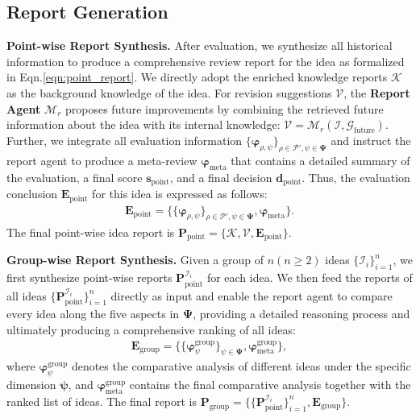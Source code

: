 \subsection{Report Generation}
\label{sec:report}
\textbf{Point-wise Report Synthesis.}
After evaluation, we synthesize all historical information to produce a comprehensive review report for the idea as formalized in Eqn.\ref{eqn:point_report}.
We directly adopt the enriched knowledge reports $\boldsymbol{\mathcal{K}}$ as the background knowledge of the idea.
For revision suggestions $\boldsymbol{\mathcal{V}}$, the \textbf{Report Agent} $\boldsymbol{\mathcal{M}}_r$ proposes future improvements by combining the retrieved future information about the idea with its internal knowledge: $\boldsymbol{\mathcal{V}}=\boldsymbol{\mathcal{M}}_r(\boldsymbol{\mathcal{I}},\boldsymbol{\mathcal{G}}_\textrm{future})$.
Further, we integrate all evaluation information $\{\boldsymbol{\varphi}_{\rho,\psi}\}_{\rho\in\boldsymbol{\mathcal{P}}',\psi\in\boldsymbol{\Psi}}$ and instruct the report agent to produce a meta-review $\boldsymbol{\varphi}_\textrm{meta}$ that contains a detailed summary of the evaluation, a final score $\boldsymbol{s}_\textrm{point}$, and a final decision $\boldsymbol{d}_\textrm{point}$.
Thus, the evaluation conclusion $\boldsymbol{E}_\textrm{point}$ for this idea is expressed as follows:
\begin{align}
    \boldsymbol{E}_\textrm{point}=\{\{\boldsymbol{\varphi}_{\rho,\psi}\}_{\rho\in\boldsymbol{\mathcal{P}}',\psi\in\boldsymbol{\Psi}},\boldsymbol{\varphi}_\textrm{meta}\}.
\end{align}
The final point-wise idea report is $\boldsymbol{P}_{\textrm{point}}=\{\boldsymbol{\mathcal{K}},\boldsymbol{\mathcal{V}},\boldsymbol{E}_{\textrm{point}}\}$.

\textbf{Group-wise Report Synthesis.}
Given a group of $n(n\ge2)$ ideas $\{\boldsymbol{\mathcal{I}}_i\}_{i=1}^n$, we first synthesize point-wise reports $\boldsymbol{P}^{\boldsymbol{\mathcal{I}}_i}_\textrm{point}$ for each idea.
We then feed the reports of all ideas $\{\boldsymbol{P}^{\mathcal{I}_i}_{\textrm{point}}\}_{i=1}^n$ directly as input and enable the report agent to compare every idea along the five aspects in $\boldsymbol{\Psi}$, providing a detailed reasoning process and ultimately producing a comprehensive ranking of all ideas:
\begin{align}
    \boldsymbol{E}_\textrm{group}=\{\{\boldsymbol{\varphi}^\textrm{group}_{\psi}\}_{\psi\in\boldsymbol{\Psi}},\boldsymbol{\varphi}^\textrm{group}_\textrm{meta}\},
\end{align}
where $\boldsymbol{\varphi}^\textrm{group}_{\psi}$ denotes the comparative analysis of different ideas under the specific dimension $\boldsymbol{\psi}$, and $\boldsymbol{\varphi}^\textrm{group}_\textrm{meta}$ contains the final comparative analysis together with the ranked list of ideas.
The final report is $\boldsymbol{P}_{\textrm{group}}=\{\{\boldsymbol{P}^{\mathcal{I}_i}_{\textrm{point}}\}_{i=1}^n, \boldsymbol{E}_{\textrm{group}}\}$.
